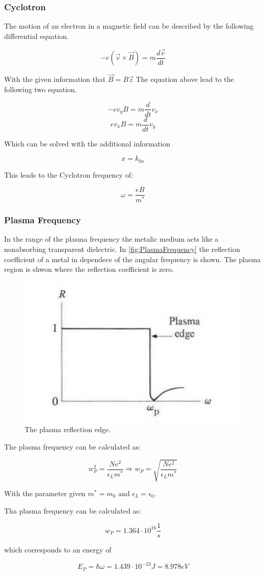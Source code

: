 \subsubsection*{Cyclotron}

The motion of an electron in a magnetic field can be 
described by the following differential equation.

\begin{equation}
    -e (\vec{v} \times \vec{B}) =  m \frac{d\vec{v}}{dt}
\end{equation}

With the given information that $\vec{B} = B\vec{z}$
The equation above lead to the following two 
equation.

$$-e v_y B = m \frac{d}{dt}v_x$$
$$e v_x B = m \frac{d}{dt}v_y$$

Which can be solved with the additional information

$$x = k_{0x}$$

This leads to the Cyclotron frequency of:

$$\omega = \frac{eB}{m^*}$$

\subsubsection*{Plasma Frequency}

In the range of the plasma frequency the metalic medium acts
like a nonabsorbing transparent dielectric.
In \autoref{fig:PlasmaFrequency} the reflection coefficient
of a metal in dependece of the angular frequency is shown. 
The plasma region is shwon where the reflection coefficient is 
zero.

\begin{figure}[H]
    \centering
    \includegraphics[width=0.6\linewidth]{Graphics/Chapter1/PlasmaFrequency.png}
    \caption{The plasma reflection edge.
    \cite[Elementary Solid State Physics p. 166]{elementary_SSP} }
    \label{fig:PlasmaFrequency}
\end{figure}

The plasma frequency can be calculated as:

\begin{equation}
    w_P^2 = \frac{Ne^2}{\epsilon_L m^*} \Rightarrow w_P = \sqrt{\frac{Ne^2}{\epsilon_L m^*}}
\end{equation}

With the parameter given $m^*=m_0$ and $\epsilon_L = \epsilon_0$.

Tha plasma frequency can be calculated as:

$$w_P = 1.364 \cdot 10^{16} \frac{1}{s}$$

which corresponds to an energy of 

$$E_P = \hbar \omega = 1.439\cdot 10^{-23}J = 8.978eV$$
